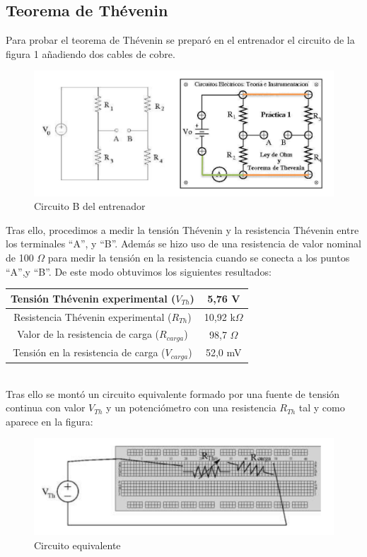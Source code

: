 \documentclass[a4paper,11pt]{article}
\begin{document}
\newpage
\subsection{Teorema de Thévenin}

Para probar el teorema de Thévenin se preparó en el entrenador el circuito de la figura 1 añadiendo dos cables de cobre.

\begin{figure}[hbtp]
\centering
\includegraphics[scale=0.5]{Imagenes/Entrenador_B.png}
\caption{Circuito B del entrenador}
\end{figure}

Tras ello, procedimos a medir la tensión Thévenin y la resistencia Thévenin entre los terminales “A”, y “B”. Además se hizo uso de una resistencia de valor nominal de 100 $\Omega$ para medir la tensión en la resistencia cuando se conecta a los puntos “A”,y “B”. De este modo obtuvimos los siguientes resultados:\\

\begin{tabular}{|c|c|}
\hline
Tensión Thévenin experimental ($V_{Th}$) & 5,76 V\\
\hline
Resistencia Thévenin experimental ($R_{Th}$) & 10,92 k$\Omega$ \\
\hline
Valor de la resistencia de carga ($R_{carga}$) & 98,7 $\Omega$ \\
\hline
Tensión en la resistencia de carga ($V_{carga}$)	& 52,0 mV \\
\hline
\end{tabular}\\

Tras ello se montó un circuito equivalente formado por una fuente de tensión continua con valor $V_{Th}$ y un potenciómetro con una resistencia $R_{Th}$ tal y como aparece en la figura:

\begin{figure}[hbtp]
\centering
\includegraphics[scale=0.5]{Imagenes/circuito.png}
\caption{Circuito equivalente}
\end{figure}
\end{document}
